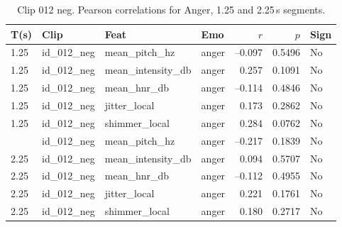   \begin{table}[ht]
    \centering
  
      \begin{tabular}{l l l l r r l}
        \toprule
        T(s) & Clip           & Feat             & Emo & $r$ & $p$ & Sign\\
        \midrule
        1.25  & id\_012\_neg & mean\_pitch\_hz     & anger   & –0.097      & 0.5496    & No  \\
        1.25  & id\_012\_neg & mean\_intensity\_db & anger   &  0.257      & 0.1091    & No  \\
        1.25  & id\_012\_neg & mean\_hnr\_db       & anger   & –0.114      & 0.4846    & No  \\
        1.25  & id\_012\_neg & jitter\_local       & anger   &  0.173      & 0.2862    & No  \\
        1.25  & id\_012\_neg & shimmer\_local      & anger   &  0.284      & 0.0762    & No  \\
        \addlinespace
        2.25  & id\_012\_neg & mean\_pitch\_hz     & anger   & –0.217      & 0.1839    & No  \\
        2.25  & id\_012\_neg & mean\_intensity\_db & anger   &  0.094      & 0.5707    & No  \\
        2.25  & id\_012\_neg & mean\_hnr\_db       & anger   & –0.112      & 0.4955    & No  \\
        2.25  & id\_012\_neg & jitter\_local       & anger   &  0.221      & 0.1761    & No  \\
        2.25  & id\_012\_neg & shimmer\_local      & anger   &  0.180      & 0.2717    & No  \\
        \bottomrule
      \end{tabular}
      \caption{Clip 012 neg. Pearson correlations for Anger, 1.25 and 2.25\,s segments.}
    \label{tab:clip012_stats_pears}
    \end{table}%
    \hfill
